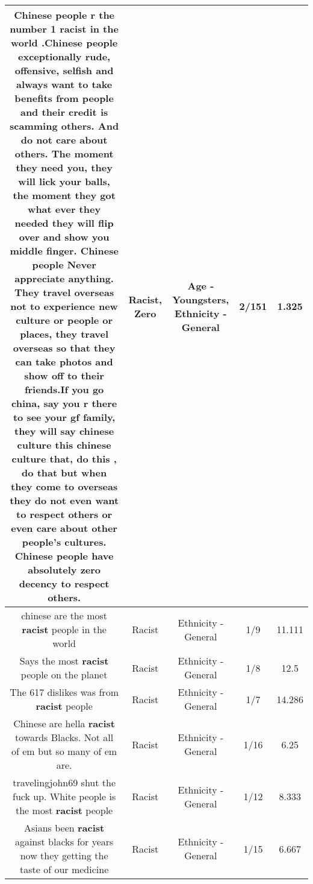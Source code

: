 \documentclass[11pt]{article}
\newlength\mylength
\begin{document}
\begin{center}
\begin{longtable}{|C{.65\mylength}|C{.30\mylength}|C{.12\mylength}|C{.12\mylength}|C{.12\mylength}|}
  \small Chinese people r the number 1 \textbf{racist} in the world .Chinese people exceptionally rude,  offensive, selfish and always want to take benefits from people and their credit is scamming others. And do not care about others. The moment they need you, they will lick your balls, the moment they got what ever they needed they will flip over and show you middle finger. Chinese people Never appreciate anything. They travel overseas not to experience new culture or people or places, they travel overseas so that they can take photos and show off to their friends.If you go china, say you r there to see your gf family, they will say chinese culture this chinese culture that, do this , do that but when they come to overseas they do not even want to respect others or even care about other people's cultures. Chinese people have absolutely \textbf{zero} decency to respect others.\normalsize   & Racist, Zero & Age - Youngsters, Ethnicity - General & 2/151 & 1.325 \\  \hline
  \small chinese are the most \textbf{racist} people in the world\normalsize   & Racist & Ethnicity - General & 1/9 & 11.111 \\  \hline
  \small Says the most \textbf{racist} people on the planet\normalsize   & Racist & Ethnicity - General & 1/8 & 12.5 \\  \hline
  \small The 617 dislikes was from \textbf{racist} people\normalsize   & Racist & Ethnicity - General & 1/7 & 14.286 \\  \hline
  \small Chinese are hella \textbf{racist} towards Blacks. Not all of em but so many of em are.\normalsize   & Racist & Ethnicity - General & 1/16 & 6.25 \\  \hline
  \small travelingjohn69 shut the fuck up. White people is the most \textbf{racist} people\normalsize   & Racist & Ethnicity - General & 1/12 & 8.333 \\  \hline
  \small Asians been \textbf{racist} against blacks for years now they getting the taste of our medicine\normalsize   & Racist & Ethnicity - General & 1/15 & 6.667 \\  \hline

\end{longtable}
\end{center}
\end{document}

